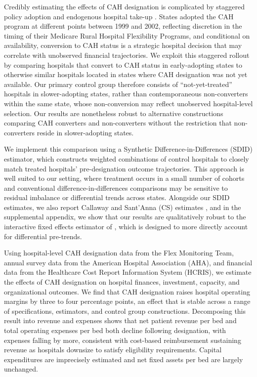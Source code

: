 \documentclass[a4paper, 12pt, twoside]{article}
\begin{document}
Credibly estimating the effects of CAH designation is complicated by staggered policy adoption and endogenous hospital take-up \citep{dalton2003}. States adopted the CAH program at different points between 1999 and 2002, reflecting discretion in the timing of their Medicare Rural Hospital Flexibility Programs, and conditional on availability, conversion to CAH status is a strategic hospital decision that may correlate with unobserved financial trajectories. We exploit this staggered rollout by comparing hospitals that convert to CAH status in early-adopting states to otherwise similar hospitals located in states where CAH designation was not yet available. Our primary control group therefore consists of ``not-yet-treated'' hospitals in slower-adopting states, rather than contemporaneous non-converters within the same state, whose non-conversion may reflect unobserved hospital-level selection. Our results are nonetheless robust to alternative constructions comparing CAH converters and non-converters without the restriction that non-converters reside in slower-adopting states.

We implement this comparison using a Synthetic Difference-in-Differences (SDID) estimator, which constructs weighted combinations of control hospitals to closely match treated hospitals' pre-designation outcome trajectories. This approach is well suited to our setting, where treatment occurs in a small number of cohorts and conventional difference-in-differences comparisons may be sensitive to residual imbalance or differential trends across states. Alongside our SDID estimates, we also report Callaway and Sant'Anna (CS) estimates \citep{callaway2021}, and in the supplemental appendix, we show that our results are qualitatively robust to the interactive fixed effects estimator of \cite{xu2017}, which is designed to more directly account for differential pre-trends.

Using hospital-level CAH designation data from the Flex Monitoring Team, annual survey data from the American Hospital Association (AHA), and financial data from the Healthcare Cost Report Information System (HCRIS), we estimate the effects of CAH designation on hospital finances, investment, capacity, and organizational outcomes. We find that CAH designation raises hospital operating margins by three to four percentage points, an effect that is stable across a range of specifications, estimators, and control group constructions. Decomposing this result into revenue and expenses shows that net patient revenue per bed and total operating expenses per bed both decline following designation, with expenses falling by more, consistent with cost-based reimbursement sustaining revenue as hospitals downsize to satisfy eligibility requirements. Capital expenditures are imprecisely estimated and net fixed assets per bed are largely unchanged. 
\end{document}
